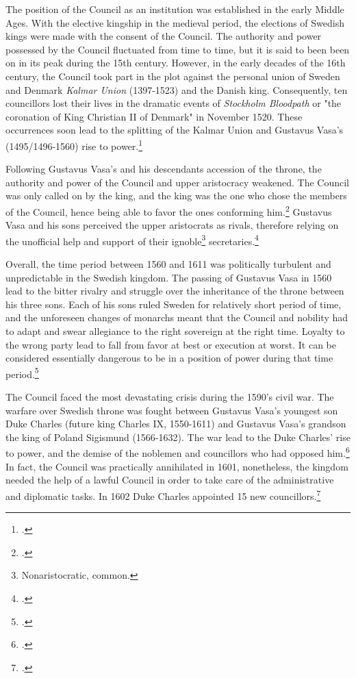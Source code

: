 The position of the Council as an institution was established in the early Middle Ages. With the elective kingship in the medieval period, the elections of Swedish kings were made with the consent of the Council. The authority and power possessed by the Council fluctuated from time to time, but it is said to been been on in its peak during the 15th century. However, in the early decades of the 16th century, the Council took part in the plot against the personal union of Sweden and Denmark \textit{Kalmar Union} (1397-1523) and the Danish king. Consequently, ten councillors lost their lives in the dramatic events of \textit{Stockholm Bloodpath} or "the coronation of King Christian II of Denmark" in November 1520. These occurrences soon lead to the splitting of the Kalmar Union and Gustavus Vasa's (1495/1496-1560) rise to power.\footcites[pp. 49-50,]{HakanenAKoskinen2017}[pp. 8-9.]{personalAgency}

Following Gustavus Vasa's and his descendants accession of the throne, the authority and power of the Council and upper aristocracy weakened. The Council was only called on by the king, and the king was the one who chose the members of the Council, hence being able to favor the ones conforming him.\footcite[p. 58.]{pSuurvalta} Gustavus Vasa and his sons perceived the upper aristocrats as rivals, therefore relying on the unofficial help and support of their ignoble\footnote{Nonaristocratic, common.} secretaries.\footcite[p. 53.]{HakanenAKoskinen2017}

Overall, the time period between 1560 and 1611 was politically turbulent and unpredictable in the Swedish kingdom. The passing of Gustavus Vasa in 1560 lead to the bitter rivalry and struggle over the inheritance of the throne between his three sons. Each of his sons ruled Sweden for relatively short period of time, and the unforeseen changes of monarchs meant that the Council and nobility had to adapt and swear allegiance to the right sovereign at the right time. Loyalty to the wrong party lead to fall from favor at best or execution at worst. It can be considered essentially dangerous to be in a position of power during that time period.\footcites[pp. 96-121,]{pSuurvalta}[pp. 51-52.]{HakanenAKoskinen2017}

The Council faced the most devastating crisis during the 1590's civil war. The warfare over Swedish throne was fought between Gustavus Vasa's youngest son Duke Charles (future king Charles IX, 1550-1611) and Gustavus Vasa's grandson the king of Poland Sigismund (1566-1632). The war lead to the Duke Charles' rise to power, and the demise of the noblemen and councillors who had opposed him.\footcites[pp. 57-60,]{HakanenAKoskinen2017}[pp. 96-121.]{pSuurvalta} In fact, the Council was practically annihilated in 1601, nonetheless, the kingdom needed the help of a lawful Council in order to take care of the administrative and diplomatic tasks. In 1602 Duke Charles appointed 15 new councillors.\footcite[pp. 57-59.]{HakanenAKoskinen2017}


